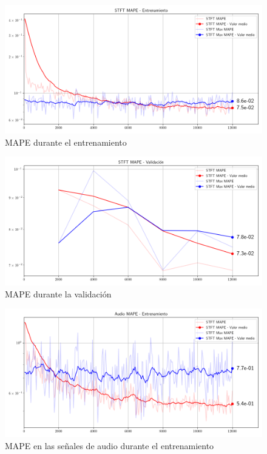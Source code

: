 \begin{figure}
	\centering
	\centerline{\includegraphics[scale=0.65]{images/ch7/entrenamiento/train_stft_mape.png}}
	\caption{MAPE durante el entrenamiento}
	\label{fig:ch7_entrenamiento_mape}
\end{figure}

\begin{figure}
	\centering
	\centerline{\includegraphics[scale=0.65]{images/ch7/entrenamiento/val_stft_mape.png}}
	\caption{MAPE durante la validación}
	\label{fig:ch7_val_mape}
\end{figure}

\begin{figure}
	\centering
	\centerline{\includegraphics[scale=0.65]{images/ch7/entrenamiento/train_audio_mape.png}}
	\caption{MAPE en las señales de audio durante el entrenamiento}
	\label{fig:ch7_entrenamiento_audio_mape}
\end{figure}

